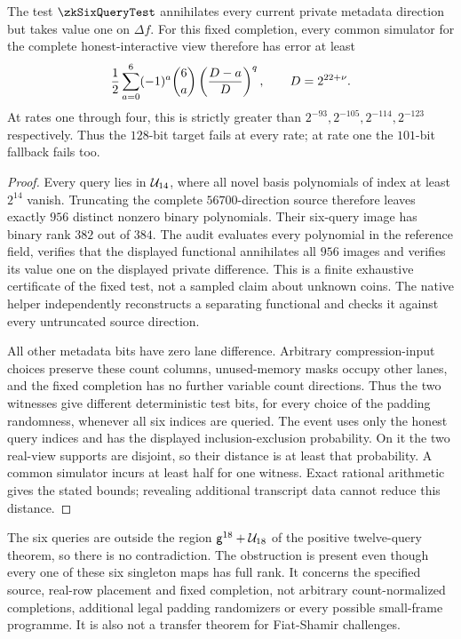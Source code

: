 \begin{proposition}\label{prop:zk-six-query-floor}
The test $\zkSixQueryTest$ annihilates every current private metadata direction but takes value one on $\Delta f$. For this fixed completion, every common simulator for the complete honest-interactive view therefore has error at least
\[
 \frac12\sum_{a=0}^6(-1)^a\binom6a\left(\frac{D-a}{D}\right)^q,
 \qquad D=2^{22+\nu}.
\]
At rates one through four, this is strictly greater than $2^{-93},2^{-105},2^{-114},2^{-123}$ respectively. Thus the $128$-bit target fails at every rate; at rate one the $101$-bit fallback fails too.
\end{proposition}
\begin{proof}
Every query lies in $\mathcal{U}_{14}$, where all novel basis polynomials of index at least $2^{14}$ vanish. Truncating the complete $56700$-direction source therefore leaves exactly $956$ distinct nonzero binary polynomials. Their six-query image has binary rank $382$ out of $384$. The audit evaluates every polynomial in the reference field, verifies that the displayed functional annihilates all $956$ images and verifies its value one on the displayed private difference. This is a finite exhaustive certificate of the fixed test, not a sampled claim about unknown coins. The native helper independently reconstructs a separating functional and checks it against every untruncated source direction.

All other metadata bits have zero lane difference. Arbitrary compression-input choices preserve these count columns, unused-memory masks occupy other lanes, and the fixed completion has no further variable count directions. Thus the two witnesses give different deterministic test bits, for every choice of the padding randomness, whenever all six indices are queried. The event uses only the honest query indices and has the displayed inclusion-exclusion probability. On it the two real-view supports are disjoint, so their distance is at least that probability. A common simulator incurs at least half for one witness. Exact rational arithmetic gives the stated bounds; revealing additional transcript data cannot reduce this distance.
\end{proof}

The six queries are outside the region $\mathsf{g}^{18}+\mathcal{U}_{18}$ of the positive twelve-query theorem, so there is no contradiction. The obstruction is present even though every one of these six singleton maps has full rank. It concerns the specified source, real-row placement and fixed completion, not arbitrary count-normalized completions, additional legal padding randomizers or every possible small-frame programme. It is also not a transfer theorem for Fiat-Shamir challenges.

